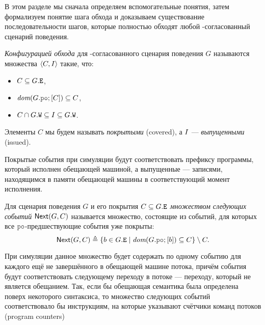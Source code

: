 В этом разделе
мы сначала определяем вспомогательные понятия,
затем формализуем понятие шага обхода и доказываем существование
последовательности шагов, которые полностью обходят любой \ARM-согласованный сценарий поведения.
\begin{definition}
\emph{Конфигурацией обхода} для \ARM-согласованного сценария поведения $G$
называются множества ${\langle{C, I}\rangle}$ такие, что:
\begin{itemize}
  \item $C \subseteq G.{\mathtt{E}}$,
  \item $\dom{G.\lPO;[C]}\suq C$,
  \item $C \cap G.{\mathtt{W}} \subseteq I \subseteq G.{\mathtt{W}}$.
\end{itemize}
Элементы $C$ мы будем называть \emph{покрытыми} (covered), а $I$ --- \emph{выпущенными} (issued).
\end{definition}
Покрытые события при симуляции будут соответствовать префиксу программы,
который исполнен обещающей машиной, а выпущенные --- записями, 
находящимся в памяти обещающей машины
в соответствующий момент исполнения.
\begin{definition}
  Для 
  сценария поведения $G$ и его покрытия $C \subseteq G.{\mathtt{E}}$ \emph{множеством следующих событий} ${\sf Next}(G, C)$
  называется множество, состоящие из событий, для которых все $\lPO$-предшествующие события уже покрыты:
  \[\nextset(G, C) \defeq \{b \in G.\lE \mid \dom{G.\lPO;[b]} \suq C\} \setminus C.\]
\end{definition}
При симуляции данное множество будет содержать по одному событию для каждого ещё не завершённого в обещающей машине потока,
причём события будут соответствовать следующему переходу в потоке --- переходу, который не является обещанием.
Так, если бы обещающая семантика была определена поверх некоторого синтаксиса, то множество
следующих событий соответствовало бы инструкциям, на которые указывают счётчики команд  потоков (program counters)
